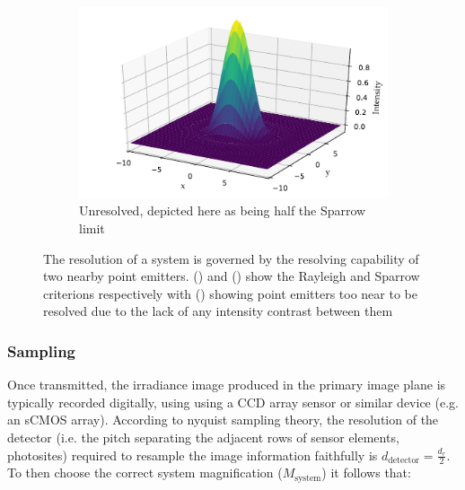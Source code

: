     \begin{figure}
    \ContinuedFloat
    \begin{subfigure}[b]{\textwidth}
        \includegraphics{+airy_too_close}
        \caption{Unresolved, depicted here as being half the Sparrow limit}
        \label{fig:airy_too_close}
    \end{subfigure}
    \caption{The resolution of a system is governed by the resolving capability of two nearby point emitters.
    () and () show the Rayleigh and Sparrow criterions respectively with () showing point emitters too near to be resolved due to the lack of any intensity contrast between them}
    \label{fig:airy_disk_resolution}
\end{figure}

%

\subsubsection{Sampling}


Once transmitted, the irradiance image produced in the primary image plane is typically recorded digitally, using using a \gls{CCD} array sensor or similar device (e.g. an \gls{sCMOS} array).
According to \Gls{nyquist sampling theory}, the resolution of the detector (i.e. the pitch separating the adjacent rows of sensor elements, photosites) required to resample the image information faithfully is \(d_\text{detector} = \frac{d_r}{2}\).
To then choose the correct system magnification (\(M_\text{system}\)) it follows that:


